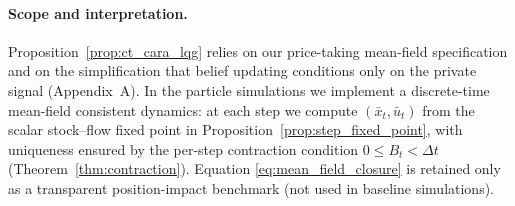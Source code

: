 \paragraph*{Scope and interpretation.}
Proposition~\ref{prop:ct_cara_lqg} relies on our price-taking mean-field specification and on the simplification that belief updating conditions only on the private signal (Appendix~A). In the particle simulations we implement a discrete-time mean-field consistent dynamics: at each step we compute $(\bar x_t,\bar u_t)$ from the scalar stock--flow fixed point in Proposition~\ref{prop:step_fixed_point}, with uniqueness ensured by the per-step contraction condition $0\le B_t<\Delta t$ (Theorem~\ref{thm:contraction}). Equation \eqref{eq:mean_field_closure} is retained only as a transparent position-impact benchmark (not used in baseline simulations).

